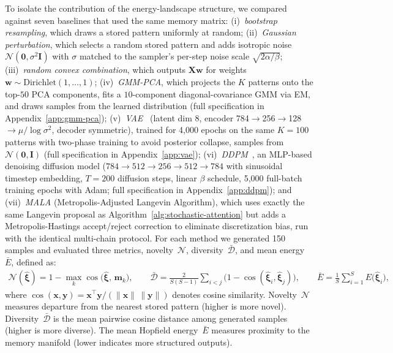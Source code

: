 To isolate the contribution of the energy-landscape structure, we compared against seven baselines that used the same memory matrix: (i)~\emph{bootstrap resampling}, which draws a stored pattern uniformly at random; (ii)~\emph{Gaussian perturbation}, which selects a random stored pattern and adds isotropic noise $\mathcal{N}(\mathbf{0},\sigma^{2}\mathbf{I})$ with $\sigma$ matched to the sampler's per-step noise scale $\sqrt{2\alpha/\beta}$; (iii)~\emph{random convex combination}, which outputs $\mathbf{X}\mathbf{w}$ for weights $\mathbf{w}\sim\mathrm{Dirichlet}(1,\dots,1)$; (iv)~\emph{GMM-PCA}, which projects the $K$ patterns onto the top-$50$ PCA components, fits a $10$-component diagonal-covariance GMM via EM, and draws samples from the learned distribution (full specification in Appendix~\ref{app:gmm-pca}); (v)~\emph{VAE}~\cite{kingmaWellingAutoEncoding2014} (latent dim 8, encoder 784$\to$256$\to$128$\to\mu/\log\sigma^2$, decoder symmetric), trained for 4{,}000 epochs on the same $K{=}100$ patterns with two-phase training to avoid posterior collapse, samples from $\mathcal{N}(\mathbf{0},\mathbf{I})$ (full specification in Appendix~\ref{app:vae}); (vi)~\emph{DDPM}~\cite{hoDenoisingDiffusionProbabilistic2020}, an MLP-based denoising diffusion model ($784\to512\to256\to512\to784$ with sinusoidal timestep embedding, $T{=}200$ diffusion steps, linear $\beta$ schedule, 5{,}000 full-batch training epochs with Adam; full specification in Appendix~\ref{app:ddpm}); and (vii)~\emph{MALA} (Metropolis-Adjusted Langevin Algorithm), which uses exactly the same Langevin proposal as Algorithm~\ref{alg:stochastic-attention} but adds a Metropolis-Hastings accept/reject correction to eliminate discretization bias, run with the identical multi-chain protocol.
For each method we generated 150 samples and evaluated three metrics, novelty~$\mathcal{N}$, diversity~$\bar{\mathcal{D}}$, and mean energy~$\bar{E}$, defined as:
\begin{align*}
\mathcal{N}(\hat{\boldsymbol{\xi}}) = 1 - \max_{k}\cos\!\bigl(\hat{\boldsymbol{\xi}},\,\mathbf{m}_{k}\bigr),\qquad
\bar{\mathcal{D}} = \frac{2}{S(S{-}1)}\!\sum_{i<j}\bigl(1-\cos(\hat{\boldsymbol{\xi}}_i,\hat{\boldsymbol{\xi}}_j)\bigr),\qquad
\bar{E} = \frac{1}{S}\sum_{i=1}^{S} E\!\bigl(\hat{\boldsymbol{\xi}}_i\bigr),
\end{align*}
where $\cos(\mathbf{x},\mathbf{y})=\mathbf{x}^{\top}\mathbf{y}/(\lVert\mathbf{x}\rVert\,\lVert\mathbf{y}\rVert)$ denotes cosine similarity.
Novelty~$\mathcal{N}$ measures departure from the nearest stored pattern (higher is more novel). Diversity~$\bar{\mathcal{D}}$ is the mean pairwise cosine distance among generated samples (higher is more diverse). The mean Hopfield energy~$\bar{E}$ measures proximity to the memory manifold (lower indicates more structured outputs).

